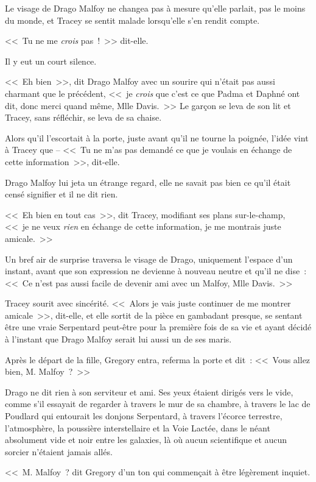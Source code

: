 Le visage de Drago Malfoy ne changea pas à mesure qu'elle parlait, pas le moins du monde, et Tracey se sentit malade lorsqu'elle s'en rendit compte.

<<~Tu ne me \emph{crois} pas~!~>> dit-elle.

Il y eut un court silence.

<<~Eh bien~>>, dit Drago Malfoy avec un sourire qui n'était pas aussi charmant que le précédent, <<~je \emph{crois} que c'est ce que Padma et Daphné ont dit, donc merci quand même, Mlle Davis.~>> Le garçon se leva de son lit et Tracey, sans réfléchir, se leva de sa chaise.

Alors qu'il l'escortait à la porte, juste avant qu'il ne tourne la poignée, l'idée vint à Tracey que -- <<~Tu ne m'as pas demandé ce que je voulais en échange de cette information~>>, dit-elle.

Drago Malfoy lui jeta un étrange regard, elle ne savait pas bien ce qu'il était censé signifier et il ne dit rien.

<<~Eh bien en tout cas~>>, dit Tracey, modifiant ses plans sur-le-champ, <<~je ne veux \emph{rien} en échange de cette information, je me montrais juste amicale.~>>

Un bref air de surprise traversa le visage de Drago, uniquement l'espace d'un instant, avant que son expression ne devienne à nouveau neutre et qu'il ne dise~: <<~Ce n'est pas aussi facile de devenir ami avec un Malfoy, Mlle Davis.~>>

Tracey sourit avec sincérité. <<~Alors je vais juste continuer de me montrer amicale~>>, dit-elle, et elle sortit de la pièce en gambadant presque, se sentant être une vraie Serpentard peut-être pour la première fois de sa vie et ayant décidé à l'instant que Drago Malfoy serait lui aussi un de ses maris.

\later

Après le départ de la fille, Gregory entra, referma la porte et dit~: <<~Vous allez bien, M. Malfoy~?~>>

Drago ne dit rien à son serviteur et ami. Ses yeux étaient dirigés vers le vide, comme s'il essayait de regarder à travers le mur de sa chambre, à travers le lac de Poudlard qui entourait les donjons Serpentard, à travers l'écorce terrestre, l'atmosphère, la poussière interstellaire et la Voie Lactée, dans le néant absolument vide et noir entre les galaxies, là où aucun scientifique et aucun sorcier n'étaient jamais allés.

<<~M. Malfoy~? dit Gregory d'un ton qui commençait à être légèrement inquiet.

